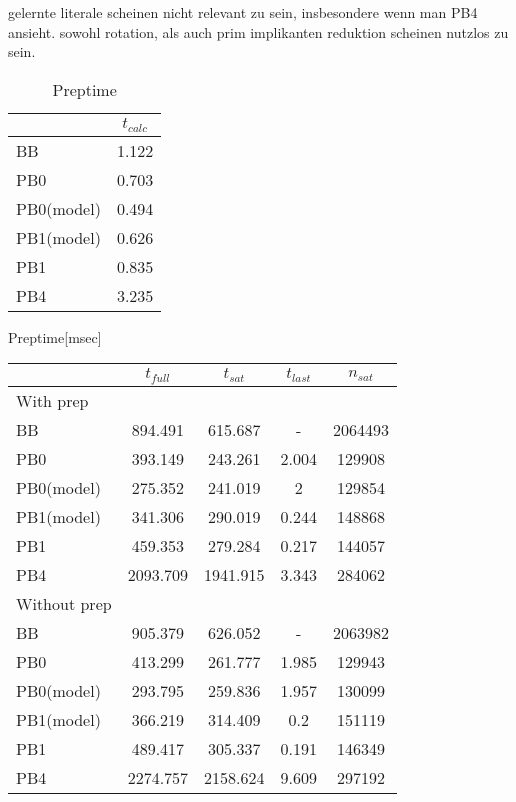 gelernte literale scheinen nicht relevant zu sein, insbesondere wenn man PB4 ansieht. sowohl rotation, als auch prim implikanten reduktion scheinen nutzlos zu sein.

\begin{wraptable}{R}{4cm}
\begin{tabular}{l| c }
& $t_{calc}$\\
\hline
BB & 1.122 \\
PB0 & 0.703 \\
PB0(model) & 0.494 \\
PB1(model) & 0.626 \\
PB1 & 0.835 \\
PB4 & 3.235 \\
\end{tabular}
\caption{Preptime}
\end{wraptable}
Preptime[msec]


\begin{table}
\begin{tabular}{l | c c c c}
 & $t_{full}$ & $t_{sat}$ & $t_{last}$& $n_{sat}$\\
\hline
With prep\\
BB & 894.491 & 615.687 & - & 2064493\\
PB0 & 393.149 & 243.261 & 2.004 & 129908\\
PB0(model) & 275.352 & 241.019 & 2 & 129854\\
PB1(model) & 341.306 & 290.019 & 0.244 & 148868\\
PB1 & 459.353 & 279.284 & 0.217 & 144057\\
PB4 & 2093.709 & 1941.915 & 3.343 & 284062\\
\hline
Without prep\\
BB & 905.379 & 626.052 & - & 2063982\\
PB0 & 413.299 & 261.777 & 1.985 & 129943\\
PB0(model) & 293.795 & 259.836 & 1.957 & 130099\\
PB1(model) & 366.219 & 314.409 & 0.2 & 151119\\
PB1 & 489.417 & 305.337 & 0.191 & 146349\\
PB4 & 2274.757 & 2158.624 & 9.609 & 297192\\
\end{tabular}
\end{table}

